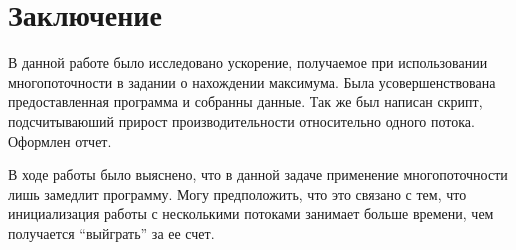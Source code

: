 \documentclass[a4paper, 12pt]{article}
\begin{document}




\section{Заключение}

В данной работе было исследовано ускорение, получаемое при использовании многопоточности в задании о нахождении максимума.
Была усовершенствована предоставленная программа и собранны данные.
Так же был написан скрипт, подсчитываюший прирост производительности относительно одного потока.
Оформлен отчет.

В ходе работы было выяснено, что в данной задаче применение многопоточности лишь замедлит программу.
Могу предположить, что это связано с тем, что инициализация работы с несколькими потоками занимает больше времени, чем получается ``выйграть'' за ее счет.


\end{document}
